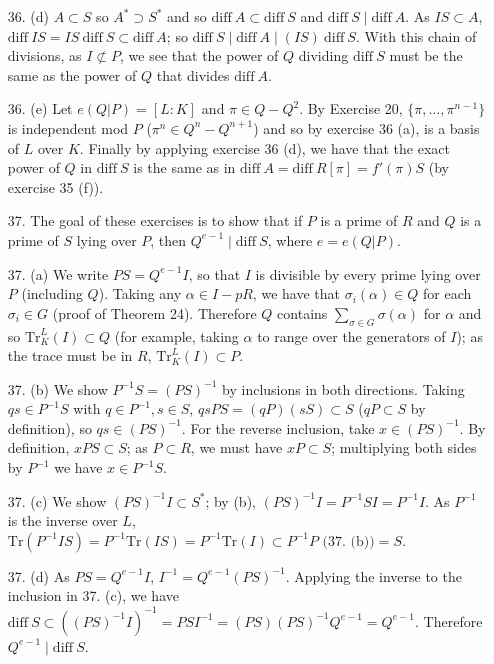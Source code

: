 \documentclass{article}
\newcommand{\trace}[1]{\text{Tr}(#1)}
\newcommand{\diff}[1]{\text{diff}\ #1}
\begin{document}
\begin{enumerate}
\item[36. (d)] $A \subset S$ so $A^{*} \supset S^{*}$ and so $\diff{A} \subset \diff{S}$ and $\diff{S} \mid \diff{A}$.  As $IS \subset A$, $\diff{IS} = IS\ \diff{S} \subset \diff{A}$; so $\diff{S} \mid \diff{A} \mid (IS)\ \diff{S}$.  With this chain of divisions, as $I \not\subset P$, we see that the power of $Q$ dividing $\diff{S}$ must be the same as the power of $Q$ that divides $\diff{A}$.

\item[36. (e)]  Let $e(Q|P) = [L:K]$ and $\pi \in Q - Q^2$.  By Exercise 20, $\{ \pi, \ldots, \pi^{n-1} \}$ is independent mod $P$ ($\pi^n \in Q^n - Q^{n+1}$) and so by exercise 36 (a), is a basis of $L$ over $K$.  Finally by applying exercise 36 (d), we have that the exact power of $Q$ in $\diff{S}$ is the same as in $\diff{A} = \diff{R[\pi]} = f'(\pi)S$ (by exercise 35 (f)).

\item[37.] The goal of these exercises is to show that if $P$ is a prime of $R$ and $Q$ is a prime of $S$ lying over $P$, then $Q^{e-1} \mid \diff{S}$, where $e = e(Q|P)$.

\item[37. (a)] We write $PS = Q^{e-1}I$, so that $I$ is divisible by every prime lying over $P$ (including $Q$).  Taking any $\alpha \in I - pR$, we have that $\sigma_i(\alpha) \in Q$ for each $\sigma_i \in G$ (proof of Theorem 24).  Therefore $Q$ contains $\sum_{\sigma \in G} \sigma(\alpha)$ for $\alpha$ and so $\text{Tr}^{L}_{K}(I) \subset Q$ (for example, taking $\alpha$ to range over the generators of $I$); as the trace must be in $R$, $\text{Tr}^{L}_{K}(I) \subset P$.

\item[37. (b)] We show $P^{-1}S = (PS)^{-1}$ by inclusions in both directions.  Taking $qs \in P^{-1}S$ with $q \in P^{-1}, s \in S$, $qsPS = (qP)(sS) \subset S$ ($qP \subset S$ by definition), so $qs \in (PS)^{-1}$.  For the reverse inclusion, take $x \in (PS)^{-1}$.  By definition, $xPS \subset S$; as $P \subset R$, we must have $xP \subset S$; multiplying both sides by $P^{-1}$ we have $x \in P^{-1}S$.

\item[37. (c)] We show $(PS)^{-1}I \subset S^{*}$; by (b), $(PS)^{-1}I = P^{-1}SI = P^{-1}I$.  As $P^{-1}$ is the inverse over $L$, $\trace{P^{-1}IS} = P^{-1}\trace{IS} = P^{-1}\trace{I} \subset P^{-1}P \text{ (37. (b))} = S$.

\item[37. (d)] As $PS = Q^{e-1}I$, $I^{-1} = Q^{e-1}(PS)^{-1}$.  Applying the inverse to the inclusion in 37. (c), we have $\diff{S} \subset ((PS)^{-1}I)^{-1} = PSI^{-1} = (PS)(PS)^{-1}Q^{e-1} = Q^{e-1}$.  Therefore $Q^{e-1} \mid \diff S$.


\end{enumerate}
\end{document}
